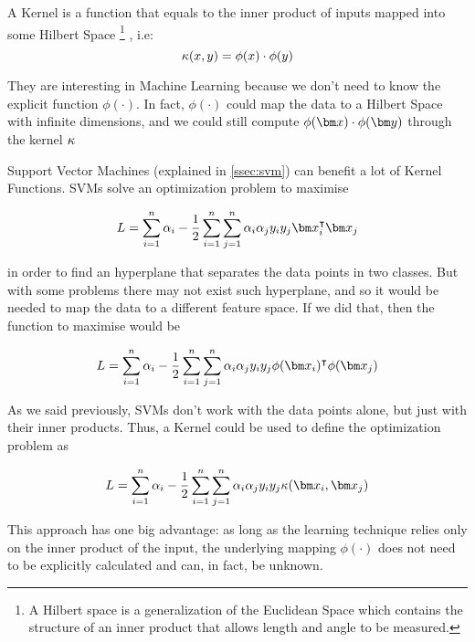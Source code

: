 \begin{pre-delivery}
  A Kernel\cite{bergman1970kernel} is a function that equals to the inner product of inputs mapped into
  some Hilbert Space
  \footnote{A Hilbert space is a generalization of the Euclidean Space which contains
  the structure of an inner product that allows length and angle to be
  measured.}
  , i.e:
  \begin{equation}
  \kappa(x,y) = \phi(x)\cdot\phi(y)
\end{equation}

They are interesting in Machine Learning because we don't need to know the
explicit function $\phi(\cdot)$. In fact, $\phi(\cdot)$ could map the data to
a Hilbert Space with infinite dimensions, and we could still compute
$\phi(\vx)\cdot\phi(\vy)$ through the kernel $\kappa$

Support Vector Machines (explained in \ref{ssec:svm}) can benefit a lot of
Kernel Functions. SVMs solve an
optimization problem to maximise

\begin{equation}
  L = \sum_{i = 1}^n\alpha_i -\frac{1}{2}\sum_{i = 1}^n\sum_{j = 1}^n\alpha_i\alpha_jy_iy_j\vx_i^\transp\vx_j
\end{equation}

in order to find an hyperplane that separates the data points in two classes.
But with some problems there may not exist such hyperplane, and so it would
be needed to map the data to a different feature space. If we did that, then
the function to maximise would be

\begin{equation}
  L = \sum_{i = 1}^n\alpha_i -\frac{1}{2}\sum_{i = 1}^n\sum_{j = 1}^n\alpha_i\alpha_jy_iy_j\phi(\vx_i)^\transp\phi(\vx_j)
\end{equation}

As we said previously, SVMs don't work with the data points alone, but just with
their inner products. Thus, a Kernel could be used to define the optimization
problem as

\begin{equation}
  L = \sum_{i = 1}^n\alpha_i -\frac{1}{2}\sum_{i = 1}^n\sum_{j = 1}^n\alpha_i\alpha_jy_iy_j\kernel(\vx_i, \vx_j)
\end{equation}

This approach has one big advantage:
as long as the learning technique relies
only on the inner product of the input, the underlying mapping $\phi(\cdot)$
does not need to be explicitly calculated and can, in fact, be unknown\cite{burges1998tutorial}.


\end{pre-delivery}
